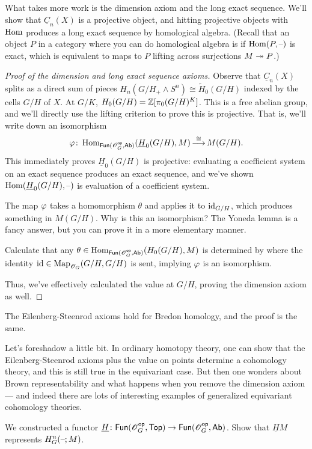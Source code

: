 What takes more work is the dimension axiom and the long exact sequence. We'll show that $\underline C_n(X)$ is a
projective object, and hitting projective objects with $\operatorname{Hom}$ produces a long exact sequence by homological
algebra. (Recall that an object $P$ in a category where you can do homological algebra is  if
$\operatorname{Hom}(P,\text{--})$ is exact, which is equivalent to maps to $P$ lifting across surjections $M\twoheadrightarrow P$.)
\begin{proof}[Proof of the dimension and long exact sequence axioms]
Observe that $\underline C_n(X)$ splits as a direct sum of pieces $H_n(G/H_+\wedge S^n)\cong \widetilde H_0(G/H)$
indexed by the cells $G/H$ of $X$. At $G/K$, $H_0(G/H) = \mathbb Z[\pi_0(G/H)^K]$. This is a free abelian group, and
we'll directly use the lifting criterion to prove this is projective. That is, we'll write down an isomorphism
\[\varphi\colon\operatorname{Hom}_{\mathsf{Fun}(\mathscr O_G^{\mathsf{op}}, \mathsf{Ab})}(\underline H_0(G/H), M) \mathop{\longrightarrow}\limits^{\cong} M(G/H).\]
This immediately proves $\underline H_0(G/H)$ is projective: evaluating a coefficient system on an exact sequence
produces an exact sequence, and we've shown $\operatorname{Hom}(\underline H_0(G/H), \text{--})$ is evaluation of a coefficient system.

The map $\varphi$ takes a homomorphism $\theta$ and applies it to $\mathrm{id}_{G/H}$, which produces something in $M(G/H)$.
Why is this an isomorphism? The Yoneda lemma is a fancy answer, but you can prove it in a more elementary manner.
\begin{ex}
Calculate that any $\theta\in\operatorname{Hom}_{\mathsf{Fun}(\mathscr O_G^{\mathsf{op}}, \mathsf{Ab})}(H_0(G/H), M)$ is determined by where the identity
$\mathrm{id}\in\operatorname{Map}_{\mathscr O_G}(G/H, G/H)$ is sent, implying $\varphi$ is an isomorphism.
\end{ex}
Thus, we've effectively calculated the value at $G/H$, proving the dimension axiom as well.
\end{proof}
The Eilenberg-Steenrod axioms hold for Bredon homology, and the proof is the same.
\begin{rem}
Let's foreshadow a little bit. In ordinary homotopy theory, one can show that the Eilenberg-Steenrod axioms
plus the value on points determine a cohomology theory, and this is still true in the equivariant case. But then
one wonders about Brown representability and what happens when you remove the dimension axiom --- and indeed
there are lots of interesting examples of generalized equivariant cohomology theories.
\end{rem}
\begin{ex}
We constructed a functor $\underline H\colon\mathsf{Fun}(\mathscr O_G^{\mathsf{op}},\mathsf{Top})\to \mathsf{Fun}(\mathscr O_G^{\mathsf{op}}, \mathsf{Ab})$. Show that $\underline HM$
represents $H_G^n(\text{--}; M)$.
\end{ex}
